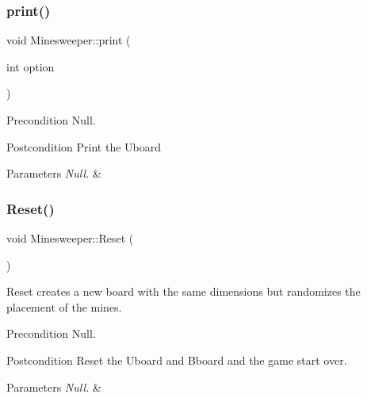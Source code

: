 \subsubsection{\texorpdfstring{print()}{print()}}
{\footnotesize\ttfamily void Minesweeper\+::print (\begin{DoxyParamCaption}\item[{int}]{option }\end{DoxyParamCaption})}

\begin{DoxyPrecond}{Precondition}
Null. 
\end{DoxyPrecond}
\begin{DoxyPostcond}{Postcondition}
Print the Uboard 
\end{DoxyPostcond}

\begin{DoxyParams}{Parameters}
{\em Null.} & \\
\hline
\end{DoxyParams}
\mbox{\label{class_minesweeper_a7bb8b53ca69cd4959e5123a07047702f}} 
\subsubsection{\texorpdfstring{Reset()}{Reset()}}
{\footnotesize\ttfamily void Minesweeper\+::\+Reset (\begin{DoxyParamCaption}{ }\end{DoxyParamCaption})}



Reset creates a new board with the same dimensions but randomizes the placement of the mines. 

\begin{DoxyPrecond}{Precondition}
Null. 
\end{DoxyPrecond}
\begin{DoxyPostcond}{Postcondition}
Reset the Uboard and Bboard and the game start over. 
\end{DoxyPostcond}

\begin{DoxyParams}{Parameters}
{\em Null.} & \\
\hline
\end{DoxyParams}
\mbox{\label{class_minesweeper_a4da8ec9ff58f3e663eed64ab70d523be}} 
